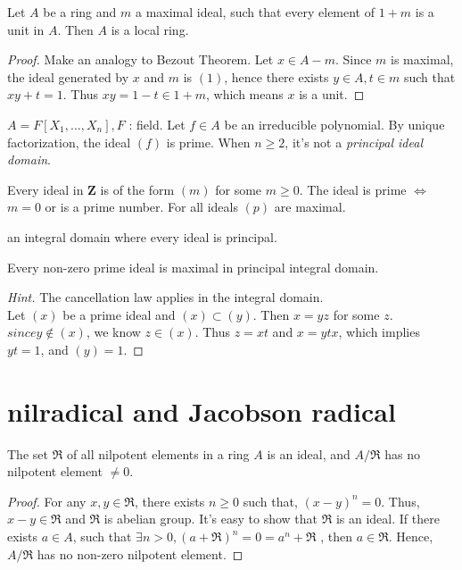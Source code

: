 \documentclass[11pt,fleqn]{book} %
\begin{document}
\begin{CJK}{UTF8}{gkai}
\begin{proposition}
	Let $A$ be a ring and $m$ a maximal ideal, such that every element of $1 + m$ is a unit in $A$. Then $A$ is a local ring.
\end{proposition}
\begin{proof}
	Make an analogy to Bezout Theorem. Let $x \in A - m$. Since $m$ is maximal, the ideal generated by $x$ and $m$ is $(1)$, hence there exists $y \in A, t\in m$ such that $xy + t = 1$.
	Thus $xy = 1 - t \in 1 + m$, which means $x$ is a unit. 
\end{proof}

\begin{example}
	$A = F[X_1,...,X_n], F$ : field. Let $f \in A$ be an irreducible polynomial. By unique factorization, the ideal $(f)$ is prime. When $n \geq 2$, it's not a {\it principal ideal domain}.	
\end{example}

\begin{example}
	Every ideal in $\mathbf{Z}$ is of the form $(m)$ for some $m \geq 0$. The ideal is prime $\iff$ $m = 0$ or is a prime number. For all ideals $(p)$ are maximal.
\end{example}

\begin{definition}
	 an integral domain where every ideal is principal.
\end{definition}

\begin{proposition}
	Every non-zero prime ideal is maximal in principal integral domain.
\end{proposition}
\begin{proof}
	[Hint] The cancellation law applies in the integral domain. \\
	Let $(x)$ be a prime ideal and $(x) \subset (y)$. Then $x = yz$ for some $z$. $since y \notin (x)$, we know $z \in (x)$. Thus $z = xt$ and $x = ytx$, which implies $yt = 1$, and $(y) = 1$.
\end{proof}

\section{nilradical and Jacobson radical}
\begin{proposition}
	The set $\mathfrak{R}$ of all nilpotent elements in a ring $A$ is an ideal, and $A / \mathfrak{R}$ has no nilpotent element $\neq 0$.
\end{proposition}
\begin{proof}
	For any $x,y \in \mathfrak{R}$, there exists $n \geq 0$ such that, $(x-y)^n = 0$. Thus, $x - y \in \mathfrak{R}$ and $\mathfrak{R}$ is abelian group. It's easy to show that $\mathfrak{R}$ is an ideal.
	If there exists $a \in A$, such that $\exists n > 0, (a + \mathfrak{R})^n = 0 = a^n + \mathfrak{R}$ , then $a \in \mathfrak{R}$. Hence, $A / \mathfrak{R}$ has no non-zero nilpotent element.
\end{proof}


\end{CJK}
\end{document}
